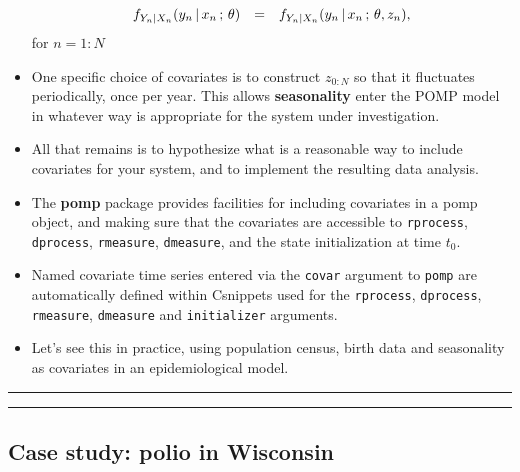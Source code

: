\documentclass[]{article}
\begin{document}
\begin{itemize}
\[\begin{array}{lcl}
  \\
  f_{Y_{n}|X_n}(y_{n}{\, | \,} x_n\, ; \,\theta) &=& f_{Y_{n}|X_n}(y_{n}{\, | \,} x_n\, ; \,\theta,z_n),
  \end{array}\] for \(n=1:N\)
\item
  One specific choice of covariates is to construct \(z_{0:N}\) so that
  it fluctuates periodically, once per year. This allows
  \textbf{seasonality} enter the POMP model in whatever way is
  appropriate for the system under investigation.
\item
  All that remains is to hypothesize what is a reasonable way to include
  covariates for your system, and to implement the resulting data
  analysis.
\item
  The \textbf{pomp} package provides facilities for including covariates
  in a pomp object, and making sure that the covariates are accessible
  to \texttt{rprocess}, \texttt{dprocess}, \texttt{rmeasure},
  \texttt{dmeasure}, and the state initialization at time \(t_0\).
\item
  Named covariate time series entered via the \texttt{covar} argument to
  \texttt{pomp} are automatically defined within Csnippets used for the
  \texttt{rprocess}, \texttt{dprocess}, \texttt{rmeasure},
  \texttt{dmeasure} and \texttt{initializer} arguments.
\item
  Let's see this in practice, using population census, birth data and
  seasonality as covariates in an epidemiological model.
\end{itemize}

\begin{center}\rule{0.5\linewidth}{\linethickness}\end{center}

\begin{center}\rule{0.5\linewidth}{\linethickness}\end{center}

\subsection{Case study: polio in
Wisconsin}\label{case-study-polio-in-wisconsin}
\end{document}
